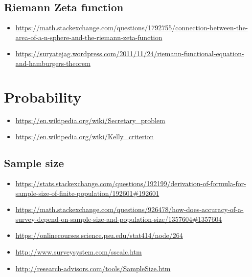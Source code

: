 \subsection{Riemann Zeta function}
\begin{itemize}
\item \url{https://math.stackexchange.com/questions/1792755/connection-between-the-area-of-a-n-sphere-and-the-riemann-zeta-function}
\item \url{https://suryatejag.wordpress.com/2011/11/24/riemann-functional-equation-and-hamburgers-theorem}
\end{itemize}


\section{Probability}
\begin{itemize}
\item \url{https://en.wikipedia.org/wiki/Secretary_problem}
\item \url{https://en.wikipedia.org/wiki/Kelly_criterion}
\end{itemize}

\subsection{Sample size}
\begin{itemize}
\item \url{https://stats.stackexchange.com/questions/192199/derivation-of-formula-for-sample-size-of-finite-population/192601#192601}
\item \url{https://math.stackexchange.com/questions/926478/how-does-accuracy-of-a-survey-depend-on-sample-size-and-population-size/1357604#1357604}
\item \url{https://onlinecourses.science.psu.edu/stat414/node/264}
\item \url{http://www.surveysystem.com/sscalc.htm}
\item \url{http://research-advisors.com/tools/SampleSize.htm}
\end{itemize}



